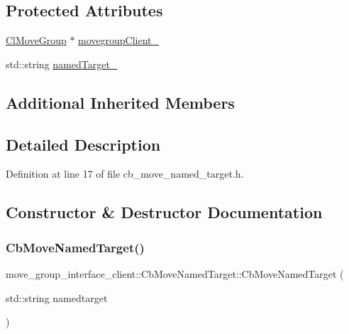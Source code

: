 \subsection*{Protected Attributes}
\begin{DoxyCompactItemize}
\item 
\hyperlink{classmove__group__interface__client_1_1ClMoveGroup}{Cl\+Move\+Group} $\ast$ \hyperlink{classmove__group__interface__client_1_1CbMoveNamedTarget_acd7b16a1c38b103c0624fad1dfd99176}{movegroup\+Client\+\_\+}
\item 
std\+::string \hyperlink{classmove__group__interface__client_1_1CbMoveNamedTarget_a1e985a12ca30e0c6946a28940504f036}{named\+Target\+\_\+}
\end{DoxyCompactItemize}
\subsection*{Additional Inherited Members}


\subsection{Detailed Description}


Definition at line 17 of file cb\+\_\+move\+\_\+named\+\_\+target.\+h.



\subsection{Constructor \& Destructor Documentation}
\mbox{\label{classmove__group__interface__client_1_1CbMoveNamedTarget_a5046a083fb5fddc968867f50f2e778b6}} 
\subsubsection{\texorpdfstring{Cb\+Move\+Named\+Target()}{CbMoveNamedTarget()}}
{\footnotesize\ttfamily move\+\_\+group\+\_\+interface\+\_\+client\+::\+Cb\+Move\+Named\+Target\+::\+Cb\+Move\+Named\+Target (\begin{DoxyParamCaption}\item[{std\+::string}]{namedtarget }\end{DoxyParamCaption})}




